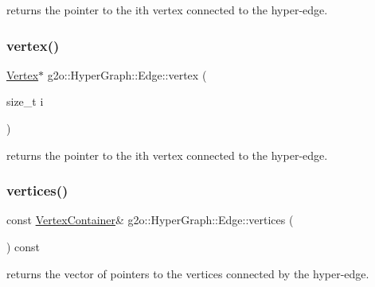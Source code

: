 returns the pointer to the ith vertex connected to the hyper-\/edge. \mbox{\label{classg2o_1_1_hyper_graph_1_1_edge_af544d5d17d900c5aa2b5c9219d8e716f}} 
\subsubsection{\texorpdfstring{vertex()}{vertex()}\hspace{0.1cm}{\footnotesize\ttfamily [2/2]}}
{\footnotesize\ttfamily \mbox{\hyperlink{classg2o_1_1_hyper_graph_1_1_vertex}{Vertex}}$\ast$ g2o\+::\+Hyper\+Graph\+::\+Edge\+::vertex (\begin{DoxyParamCaption}\item[{size\+\_\+t}]{i }\end{DoxyParamCaption})\hspace{0.3cm}{\ttfamily [inline]}}

returns the pointer to the ith vertex connected to the hyper-\/edge. \mbox{\label{classg2o_1_1_hyper_graph_1_1_edge_aba1717ff01f972bd39ba992c0d9d9e04}} 
\subsubsection{\texorpdfstring{vertices()}{vertices()}\hspace{0.1cm}{\footnotesize\ttfamily [1/2]}}
{\footnotesize\ttfamily const \mbox{\hyperlink{classg2o_1_1_hyper_graph_a9339534c99300a0ddac87ba976ef188c}{Vertex\+Container}}\& g2o\+::\+Hyper\+Graph\+::\+Edge\+::vertices (\begin{DoxyParamCaption}{ }\end{DoxyParamCaption}) const\hspace{0.3cm}{\ttfamily [inline]}}

returns the vector of pointers to the vertices connected by the hyper-\/edge. \mbox{\label{classg2o_1_1_hyper_graph_1_1_edge_a67d1c5cb557deab9e9e361c63359fe60}} 
